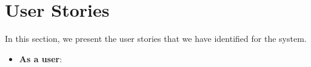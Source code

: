 \section{User Stories}
In this section, we present the user stories that we have identified for the system. 

\begin{itemize}
\item \textbf{As a user}: 
\end{itemize}

